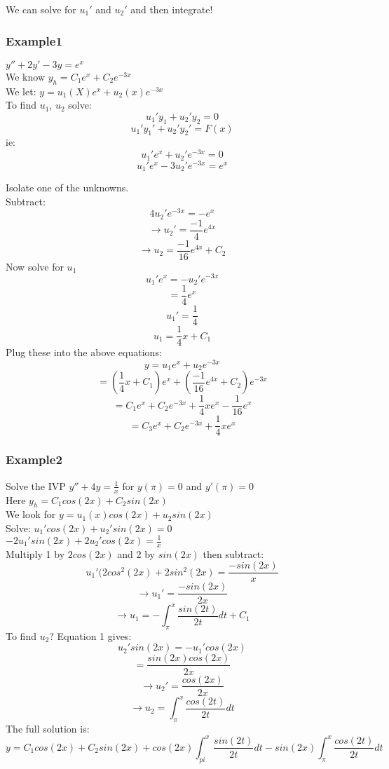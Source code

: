 \documentclass[12pt]{article}
\begin{document}
	We can solve for $u_1'$ and $u_2'$ and then integrate!\\
	
	\subsubsection*{Example1}
	$y'' + 2y' - 3y = e^x$\\
	
	We know $y_h = C_1e^x + C_2e^{-3x}$\\
	We let: $y = u_1(X)e^x + u_2(x)e^{-3x}$\\
	To find $u_1$, $u_2$ solve:\\
	$$u_1'y_1 + u_2'y_2 = 0$$
	$$u_1'y_1' + u_2'y_2' = F(x)$$
	ie:\\
	$$u_1'e^x + u_2'e^{-3x} = 0$$
	$$u_1'e^x - 3u_2'e^{-3x} = e^x$$
	
	Isolate one of the unknowns.\\
	Subtract:\\
	$$4u_2'e^{-3x} = -e^x$$
	$$\rightarrow u_2' = \frac{-1}{4}e^{4x}$$
	$$\rightarrow u_2 = \frac{-1}{16}e^{4x} + C_2$$
	Now solve for $u_1$\\
	$$u_1'e^x = -u_2'e^{-3x}$$
	$$= \frac{1}{4}e^x$$
	$$u_1' = \frac{1}{4}$$
	$$u_1 = \frac{1}{4}x + C_1$$
	Plug these into the above equations:\\
	$$y = u_1e^x + u_2e^{-3x}$$
	$$= (\frac{1}{4}x + C_1)e^x + (\frac{-1}{16}e^{4x} + C_2)e^{-3x}$$
	$$= C_1e^x + C_2e^{-3x} + \frac{1}{4}xe^x - \frac{1}{16}e^x$$
	$$= C_3e^x + C_2e^{-3x} + \frac{1}{4}xe^x$$
	
	\subsubsection*{Example2}
	Solve the IVP $y'' + 4y = \frac{1}{x}$ for $y(\pi) = 0$ and $y'(\pi) = 0$\\
	Here $y_h = C_1cos(2x) + C_2sin(2x)$\\
	We look for $y = u_1(x)cos(2x) + u_2sin(2x)$\\
	Solve: $u_1'cos(2x) + u_2'sin(2x) = 0$\\
	$-2u_1'sin(2x) + 2u_2'cos(2x) = \frac{1}{x}$\\
	Multiply 1 by $2cos(2x)$ and 2 by $sin(2x)$ then subtract:\\
	
	$$u_1'(2cos^2(2x) + 2sin^2(2x) = \frac{-sin(2x)}{x}$$
	$$\rightarrow u_1' = \frac{-sin(2x)}{2x}$$
	$$\rightarrow u_1 = -\int_{\pi}^{x}\frac{sin(2t)}{2t}dt + C_1$$
	To find $u_2$? Equation 1 gives:\\
	$$u_2'sin(2x) = -u_1'cos(2x)$$
	$$= \frac{sin(2x)cos(2x)}{2x}$$
	$$\rightarrow u_2' = \frac{cos(2x)}{2x}$$
	$$\rightarrow u_2 = \int_{\pi}^{x}\frac{cos(2t)}{2t}dt$$
	The full solution is:\\
	$$y = C_1cos(2x) + C_2sin(2x) + cos(2x)\int_{pi}^{x}\frac{sin(2t)}{2t}dt - sin(2x)\int_{\pi}^{x}\frac{cos(2t)}{2t}dt$$
	
\end{document}
